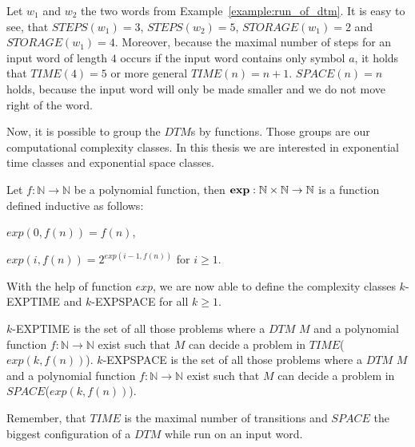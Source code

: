 \begin{example}
    \label{example:time_and_space}
    Let $w_1$ and $w_2$ the two words from Example~\ref{example:run_of_dtm}. It is easy to see, that $\mathit{STEPS}
    (w_1) = 3$, $\mathit{STEPS}(w_2) = 5$, $\mathit{STORAGE}(w_1) = 2$ and $\mathit{STORAGE}(w_1) = 4$. Moreover,
    because the maximal number of steps for an input word of length $4$ occurs if the input word contains only symbol
    $a$, it holds that $\mathit{TIME}(4) = 5$ or more general $\mathit{TIME}(n) = n + 1$. $\mathit{SPACE}(n) = n$
    holds, because the input word will only be made smaller and we do not move right of the word.
\end{example}

Now, it is possible to group the $\mathit{DTM}$s by functions. Those groups are our computational complexity classes.
In this thesis we are interested in exponential time classes and exponential space classes.

\begin{definition}
    Let $f: \mathbb{N} \rightarrow \mathbb{N}$ be a polynomial function, then $\emph{exp}: \mathbb{N} \times \mathbb{N}
    \rightarrow \mathbb{N}$ is a function defined inductive as follows:
    \begin{compactitem}
        \item $exp(0, f(n)) = f(n)$,
        \item $exp(i, f(n)) = 2^{exp(i - 1, f(n))}$ for $i \geq 1$.
    \end{compactitem}
\end{definition}

With the help of function $exp$, we are now able to define the complexity classes $k$-EXPTIME and $k$-EXPSPACE for
all $k \geq 1$.

\begin{definition}
    \label{definition:k_exptime_and_k_expspace}
    $k$-EXPTIME is the set of all those problems where a $\mathit{DTM}$ $M$ and a polynomial function $f: \mathbb{N}
    \rightarrow \mathbb{N}$ exist such that $M$ can decide a problem in $\mathit{TIME}$($exp(k, f(n))$).
    $k$-EXPSPACE is the set of all those problems where a $\mathit{DTM}$ $M$ and a polynomial function $f: \mathbb{N}
    \rightarrow \mathbb{N}$ exist such that $M$ can decide a problem in $\mathit{SPACE}$($exp(k, f(n))$).
\end{definition}

Remember, that $\mathit{TIME}$ is the maximal number of transitions and $\mathit{SPACE}$ the biggest configuration of a
$\mathit{DTM}$ while run on an input word.

